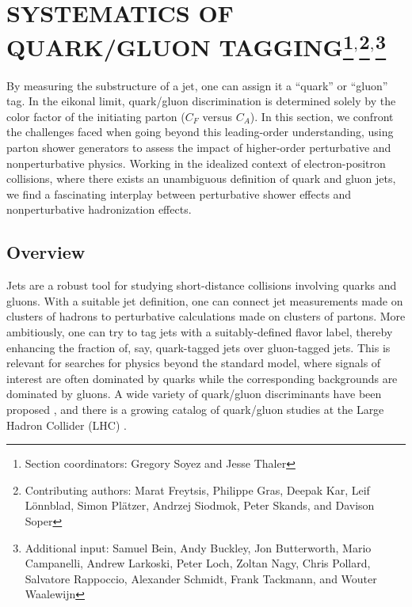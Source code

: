 \documentclass[11pt]{cernrep}
\begin{document}
\section{SYSTEMATICS OF QUARK/GLUON TAGGING\protect\footnote{Section coordinators: Gregory Soyez and Jesse Thaler}$^{,}$\protect\footnote{Contributing authors: Marat Freytsis, Philippe Gras, Deepak Kar, Leif L\"onnblad, Simon Pl\"atzer, Andrzej Siodmok, Peter Skands, and Davison Soper}$^{,}$\protect\footnote{Additional input: Samuel Bein, Andy Buckley, Jon Butterworth, Mario Campanelli, Andrew Larkoski, Peter Loch, Zoltan Nagy, Chris Pollard, Salvatore Rappoccio, Alexander Schmidt, Frank Tackmann, and Wouter Waalewijn}}

By measuring the substructure of a jet, one can assign it a ``quark'' or ``gluon'' tag.  In the eikonal limit, quark/gluon discrimination is determined solely by the color factor of the initiating parton ($C_F$ versus $C_A$).  In this section, we confront the challenges faced when going beyond this leading-order understanding, using parton shower generators to assess the impact of higher-order perturbative and nonperturbative physics.  Working in the idealized context of electron-positron collisions, where there exists an unambiguous definition of quark and gluon jets, we find a fascinating interplay between perturbative shower effects and nonperturbative hadronization effects.

\subsection{Overview}
\label{quarkgluon_sec:overview}

Jets are a robust tool for studying short-distance collisions involving quarks and gluons.  With a suitable jet definition, one can connect jet measurements made on clusters of hadrons to perturbative calculations made on clusters of partons.  More ambitiously, one can try to tag jets with a suitably-defined flavor label, thereby enhancing the fraction of, say, quark-tagged jets over gluon-tagged jets.  This is relevant for searches for physics beyond the standard model, where signals of interest are often dominated by quarks while the corresponding backgrounds are dominated by gluons.  A wide variety of quark/gluon discriminants have been proposed \cite{Gallicchio:2011xq,Gallicchio:2012ez,Krohn:2012fg,Pandolfi:1480598,Chatrchyan:2012sn,Larkoski:2013eya,Larkoski:2014pca}, and there is a growing catalog of quark/gluon studies at the Large Hadron Collider (LHC) \cite{Aad:2014gea,Aad:2014bia,Khachatryan:2014dea,Aad:2015owa,Khachatryan:2015bnx,Aad:2016oit}.
\end{document}
